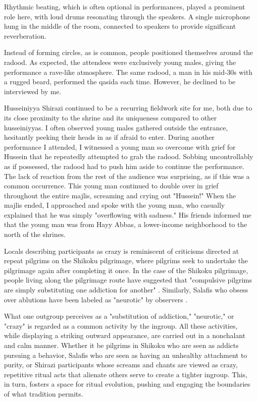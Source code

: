 Rhythmic beating, which is often optional in performances, played a prominent role here, with loud drums resonating through the speakers. A single microphone hung in the middle of the room, connected to speakers to provide significant reverberation.

Instead of forming circles, as is common, people positioned themselves around the radood. As expected, the attendees were exclusively young males, giving the performance a rave-like atmosphere. The same radood, a man in his mid-30s with a rugged beard, performed the qasida each time. However, he declined to be interviewed by me.

Husseiniyya Shirazi continued to be a recurring fieldwork site for me, both due to its close proximity to the shrine and its uniqueness compared to other husseiniyyas. I often observed young males gathered outside the entrance, hesitantly peeking their heads in as if afraid to enter. During another performance I attended, I witnessed a young man so overcome with grief for Hussein that he repeatedly attempted to grab the radood. Sobbing uncontrollably as if possessed, the radood had to push him aside to continue the performance. The lack of reaction from the rest of the audience was surprising, as if this was a common occurrence. This young man continued to double over in grief throughout the entire majlis, screaming and crying out "Hussein!" When the majlis ended, I approached and spoke with the young man, who casually explained that he was simply "overflowing with sadness." His friends informed me that the young man was from Hayy Abbas, a lower-income neighborhood to the north of the shrines.

Locals describing participants as crazy is reminiscent of criticisms directed at repeat pilgrims on the Shikoku pilgrimage, where pilgrims seek to undertake the pilgrimage again after completing it once. In the case of the Shikoku pilgrimage, people living along the pilgrimage route have suggested that "compulsive pilgrims are simply substituting one addiction for another" \cite{reader_pilgrims_2021}. Similarly, Salafis who obsess over ablutions have been labeled as "neurotic" by observers \cite[67]{gauvain_salafi_2013}.

What one outgroup perceives as a "substitution of addiction," "neurotic," or "crazy" is regarded as a common activity by the ingroup. All these activities, while displaying a striking outward appearance, are carried out in a nonchalant and calm manner. Whether it be pilgrims in Shikoku who are seen as addicts pursuing a behavior, Salafis who are seen as having an unhealthy attachment to purity, or Shirazi participants whose screams and chants are viewed as crazy, repetitive ritual acts that alienate others serve to create a tighter ingroup. This, in turn, fosters a space for ritual evolution, pushing and engaging the boundaries of what tradition permits.

